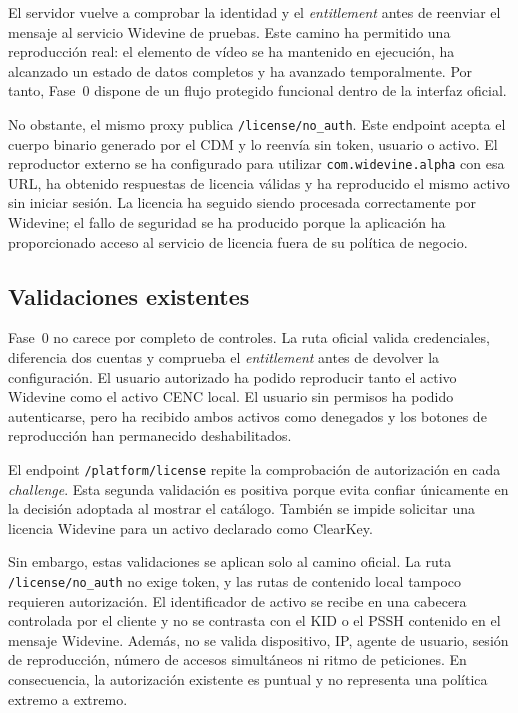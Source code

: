 El servidor vuelve a comprobar la identidad y el \textit{entitlement} antes de reenviar el mensaje al servicio Widevine de pruebas. Este camino ha permitido una reproducción real: el elemento de vídeo se ha mantenido en ejecución, ha alcanzado un estado de datos completos y ha avanzado temporalmente. Por tanto, Fase~0 dispone de un flujo protegido funcional dentro de la interfaz oficial.

No obstante, el mismo proxy publica \nolinkurl{/license/no_auth}. Este endpoint acepta el cuerpo binario generado por el CDM y lo reenvía sin token, usuario o activo. El reproductor externo se ha configurado para utilizar \nolinkurl{com.widevine.alpha} con esa URL, ha obtenido respuestas de licencia válidas y ha reproducido el mismo activo sin iniciar sesión. La licencia ha seguido siendo procesada correctamente por Widevine; el fallo de seguridad se ha producido porque la aplicación ha proporcionado acceso al servicio de licencia fuera de su política de negocio.

\subsection{Validaciones existentes}

Fase~0 no carece por completo de controles. La ruta oficial valida credenciales, diferencia dos cuentas y comprueba el \textit{entitlement} antes de devolver la configuración. El usuario autorizado ha podido reproducir tanto el activo Widevine como el activo CENC local. El usuario sin permisos ha podido autenticarse, pero ha recibido ambos activos como denegados y los botones de reproducción han permanecido deshabilitados.

El endpoint \nolinkurl{/platform/license} repite la comprobación de autorización en cada \textit{challenge}. Esta segunda validación es positiva porque evita confiar únicamente en la decisión adoptada al mostrar el catálogo. También se impide solicitar una licencia Widevine para un activo declarado como ClearKey.

Sin embargo, estas validaciones se aplican solo al camino oficial. La ruta \nolinkurl{/license/no_auth} no exige token, y las rutas de contenido local tampoco requieren autorización. El identificador de activo se recibe en una cabecera controlada por el cliente y no se contrasta con el KID o el PSSH contenido en el mensaje Widevine. Además, no se valida dispositivo, IP, agente de usuario, sesión de reproducción, número de accesos simultáneos ni ritmo de peticiones. En consecuencia, la autorización existente es puntual y no representa una política extremo a extremo.

